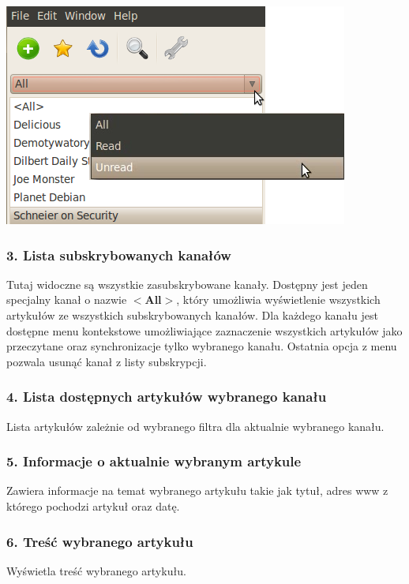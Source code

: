 \documentclass[a4paper,11pt]{report}
\begin{document}
\begin{center}
	\includegraphics[scale=0.5]{./img/menu_readmenu1.png}
\end{center}

\subsubsection*{3. Lista subskrybowanych kanałów}
Tutaj widoczne są wszystkie zasubskrybowane kanały. Dostępny jest jeden 
specjalny kanał o nazwie \textbf{$<$All$>$}, który umożliwia wyświetlenie
wszystkich artykułów ze wszystkich subskrybowanych kanałów.
Dla każdego kanału jest dostępne menu kontekstowe umożliwiające zaznaczenie
wszystkich artykułów jako przeczytane oraz synchronizacje tylko wybranego
kanału. Ostatnia opcja z menu pozwala usunąć kanał z listy subskrypcji.

\subsubsection*{4. Lista dostępnych artykułów wybranego kanału}
Lista artykułów zależnie od wybranego filtra dla aktualnie wybranego kanału.

\subsubsection*{5. Informacje o aktualnie wybranym artykule}
Zawiera informacje na temat wybranego artykułu takie jak tytuł, adres www 
z którego pochodzi artykuł oraz datę.

\subsubsection*{6. Treść wybranego artykułu}
Wyświetla treść wybranego artykułu.
\end{document}
